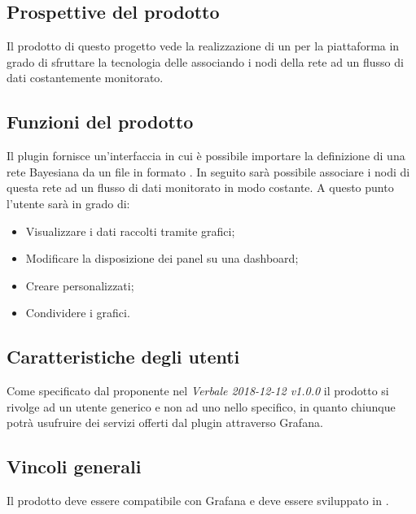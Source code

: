 
\subsection{Prospettive del prodotto}
Il prodotto di questo progetto vede la realizzazione di un  per la piattaforma  in grado di sfruttare la tecnologia delle  associando i nodi della rete ad un flusso di dati costantemente monitorato.

\subsection{Funzioni del prodotto}
Il plugin fornisce un'interfaccia in cui è possibile importare la definizione di una rete Bayesiana da un file in formato . In seguito sarà possibile associare i nodi di questa rete ad un flusso di dati monitorato in modo costante. A questo punto l'utente sarà in grado di:
\begin{itemize}
	\item Visualizzare i dati raccolti tramite grafici;
	\item Modificare la disposizione dei panel su una dashboard;
	\item Creare  personalizzati;
	\item Condividere i grafici.
\end{itemize}

\subsection{Caratteristiche degli utenti}
Come specificato dal proponente nel \emph{Verbale 2018-12-12 v1.0.0} il prodotto si rivolge ad un utente generico e non ad uno nello specifico, in quanto chiunque potrà usufruire dei servizi offerti dal plugin attraverso Grafana. 

\subsection{Vincoli generali}
Il prodotto deve essere compatibile con Grafana e deve essere sviluppato in .

\pagebreak